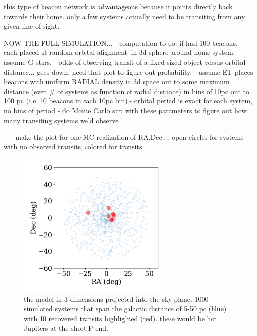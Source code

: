 \documentclass[modern]{aastex62}
\begin{document}

this type of beacon network is advantageous because it points directly back towards their home. only a few systems actually need to be transiting from any given line of sight.

NOW THE FULL SIMULATION...
- computation to do: if had 100 beacons, each placed at random orbital alignment, in 3d sphere around home system.
- assume G stars, 
- odds of observing transit of a fixed sized object versus orbital distance... goes down. need that plot to figure out probability. 
- assume ET places beacons with uniform RADIAL density in 3d space out to some maximum distance (even \# of systems as function of radial distance) in bins of 10pc out to 100 pc (i.e. 10 beacons in each 10pc bin)
- orbital period is exact for each system, no bins of period
- do Monte Carlo sim with these parameters to figure out how many transiting systems we'd observe 

---- make the plot for one MC realization of RA,Dec.... open circles for systems with no observed transits, colored for transits

\begin{figure}[]
\centering
\includegraphics[width=3in]{../figures/3d_model.pdf}
\caption{the model in 3 dimensions projected into the sky plane. 1000 simulated systems that span the galactic distance of 5-50 pc (blue) with 10 recovered transits highlighted (red). these would be hot Jupiters at the short P end.}
\label{fig:3d}
\end{figure}
\end{document}
